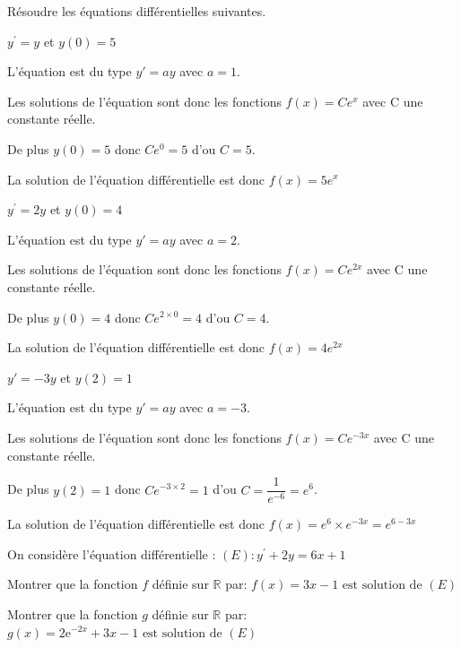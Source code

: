 \documentclass[11pt,a4paper]{article}  %
\begin{document}
Résoudre les équations différentielles suivantes.
	\begin{enumMet}
	\item $y^{\prime}=y$ et $y(0)=5$
	\begin{corrBox}
		L'équation est du type $y'=ay$ avec $a=1$. 
		
		Les solutions de l'équation sont donc les fonctions $f(x)=Ce^{x}$ avec C une constante réelle.	
		
		De plus $y(0)=5$ donc $Ce^{0}=5$ d'ou $C=5$.
		
		La solution de l'équation différentielle est donc $f(x)=5e^{x}$	
	\end{corrBox}
	\item $y^{\prime}=2 y$ et $y(0)=4$
	\begin{corrBox}
		L'équation est du type $y'=ay$ avec $a=2$. 
		
		Les solutions de l'équation sont donc les fonctions $f(x)=Ce^{2x}$ avec C une constante réelle.	
		
		De plus $y(0)=4$ donc $Ce^{2\times 0}=4$ d'ou $C=4$.
		
		La solution de l'équation différentielle est donc $f(x)=4e^{2x}$	
	\end{corrBox}
	\item $y'=-3 y$ et $y(2)=1$
	\begin{corrBox}
		L'équation est du type $y'=ay$ avec $a=-3$. 
		
		Les solutions de l'équation sont donc les fonctions $f(x)=Ce^{-3x}$ avec C une constante réelle.	
		
		De plus $y(2)=1$ donc $Ce^{-3\times 2}=1$ d'ou $C=\dfrac{1}{e^{-6}}=e^6$.
		
		La solution de l'équation différentielle est donc $f(x)=e^6\times e^{-3x}=e^{6-3x}$	
	\end{corrBox}
\end{enumMet}

\exerciceDS{}

On considère l'équation différentielle : $(E): y^{\prime}+2 y=6 x+1$

\begin{enumMet}
	\item Montrer que la fonction $f$ définie sur $\mathbb{R}$ par: $f(x)=3 x-1 \text { est solution de }(E)$
	\item Montrer que la fonction $g$ définie sur $\mathbb{R}$ par: $g(x)=2 \mathrm{e}^{-2 x}+3 x-1 \text { est solution de }(E)$
\end{enumMet}
\end{document}
